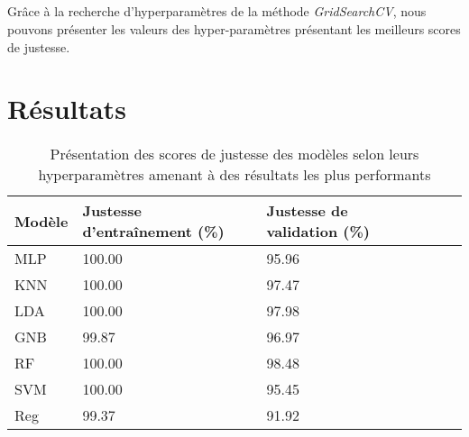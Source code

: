 \subsection{}
Grâce à la recherche d'hyperparamètres de la méthode \emph{GridSearchCV}, nous pouvons présenter les valeurs des hyper-paramètres présentant les meilleurs scores de justesse. 
\section{Résultats}
\begin{table}[H]
	\centering
	\caption{Présentation des scores de justesse des modèles selon leurs hyperparamètres amenant à des résultats les plus performants}
	\label{tab:accuracies_models}
	\begin{tabular}{lllp{3cm}p{3cm}l}
		\midrule
		Modèle & Justesse d'entraînement (\%)& Justesse de validation (\%)\\
		\midrule\midrule
		MLP & 100.00 & 95.96\\
		KNN  & 100.00 & 97.47\\
		LDA  & 100.00 & 97.98\\
		GNB  & 99.87 & 96.97\\
		RF  &  100.00 & 98.48\\
		SVM  & 100.00 & 95.45\\
		Reg  & 99.37 & 91.92\\
		\midrule
	\end{tabular}
\end{table}

